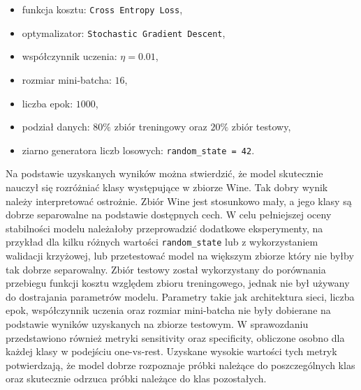 \begin{itemize}
    \item funkcja kosztu: \texttt{Cross Entropy Loss},
    \item optymalizator: \texttt{Stochastic Gradient Descent},
    \item współczynnik uczenia: \(\eta = 0.01\),
    \item rozmiar mini-batcha: \(16\),
    \item liczba epok: \(1000\),
    \item podział danych: \(80\%\) zbiór treningowy oraz \(20\%\) zbiór testowy,
    \item ziarno generatora liczb losowych: \texttt{random\_state = 42}.
\end{itemize}
\vspace{5mm}
Na podstawie uzyskanych wyników można stwierdzić, że model skutecznie nauczył
się rozróżniać klasy występujące w zbiorze Wine. 
\vspace{5mm}
Tak dobry wynik należy interpretować ostrożnie. Zbiór Wine jest
stosunkowo mały, a jego klasy są dobrze separowalne na podstawie
dostępnych cech. W celu pełniejszej oceny stabilności modelu należałoby przeprowadzić dodatkowe
eksperymenty, na przykład dla kilku różnych wartości \texttt{random\_state}
lub z wykorzystaniem walidacji krzyżowej, lub przetestować model na większym zbiorze który 
nie byłby tak dobrze separowalny.
\vspace{5mm}
Zbiór testowy został wykorzystany do porównania
przebiegu funkcji kosztu względem zbioru treningowego, jednak nie był używany
do dostrajania parametrów modelu. Parametry takie jak architektura sieci,
liczba epok, współczynnik uczenia oraz rozmiar mini-batcha nie były dobierane
na podstawie wyników uzyskanych na zbiorze testowym.
\vspace{5mm}
W sprawozdaniu przedstawiono również metryki sensitivity oraz specificity,
obliczone osobno dla każdej klasy w podejściu one-vs-rest.
Uzyskane wysokie wartości tych metryk potwierdzają, że model
dobrze rozpoznaje próbki należące do poszczególnych klas oraz skutecznie
odrzuca próbki należące do klas pozostałych.